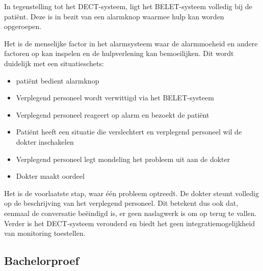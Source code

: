 In tegenstelling tot het DECT-systeem, ligt het BELET-systeem volledig bij de patiënt. Deze is in bezit van een alarmknop waarmee hulp kan worden opgeroepen.

Het is de menselijke factor in het alarmsysteem waar de alarmmoeheid en andere factoren op kan inspelen en de hulpverlening kan bemoeilijken. Dit wordt duidelijk met een situatieschets:

\begin{itemize}
  \item patiënt bedient alarmknop
  \item Verplegend personeel wordt verwittigd via het BELET-systeem
  \item Verplegend personeel reageert op alarm en bezoekt de patiënt
  \item Patiënt heeft een situatie die verslechtert en verplegend personeel wil de dokter inschakelen
  \item Verplegend personeel legt mondeling het probleem uit aan de dokter
  \item Dokter maakt oordeel
\end{itemize}

Het is de voorlaatste stap, waar één probleem optreedt. De dokter steunt volledig op de beschrijving van het verplegend personeel. Dit betekent dus ook dat, eenmaal de conversatie beëindigd is, er geen naslagwerk is om op terug te vallen. Verder is het DECT-systeem verouderd en biedt het geen integratiemogelijkheid van monitoring toestellen.

\subsection{Bachelorproef}

